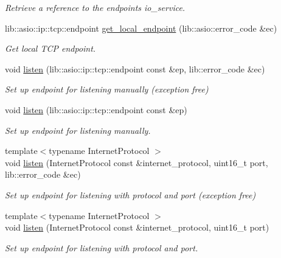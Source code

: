 \begin{DoxyCompactItemize}
\begin{DoxyCompactList}\small\item\em Retrieve a reference to the endpoint\textquotesingle{}s io\+\_\+service. \end{DoxyCompactList}\item 
lib\+::asio\+::ip\+::tcp\+::endpoint \mbox{\hyperlink{classwebsocketpp_1_1transport_1_1asio_1_1endpoint_a4147ba098fc2f1669d2f880b47917342}{get\+\_\+local\+\_\+endpoint}} (lib\+::asio\+::error\+\_\+code \&ec)
\begin{DoxyCompactList}\small\item\em Get local T\+CP endpoint. \end{DoxyCompactList}\item 
void \mbox{\hyperlink{classwebsocketpp_1_1transport_1_1asio_1_1endpoint_ac36c2b22a7c2550663792472a728f615}{listen}} (lib\+::asio\+::ip\+::tcp\+::endpoint const \&ep, lib\+::error\+\_\+code \&ec)
\begin{DoxyCompactList}\small\item\em Set up endpoint for listening manually (exception free) \end{DoxyCompactList}\item 
void \mbox{\hyperlink{classwebsocketpp_1_1transport_1_1asio_1_1endpoint_ab3d7708b939531c5c803e3b148a9b009}{listen}} (lib\+::asio\+::ip\+::tcp\+::endpoint const \&ep)
\begin{DoxyCompactList}\small\item\em Set up endpoint for listening manually. \end{DoxyCompactList}\item 
{\footnotesize template$<$typename Internet\+Protocol $>$ }\\void \mbox{\hyperlink{classwebsocketpp_1_1transport_1_1asio_1_1endpoint_ae6813b9ecda67a13a78967f72e77b061}{listen}} (Internet\+Protocol const \&internet\+\_\+protocol, uint16\+\_\+t port, lib\+::error\+\_\+code \&ec)
\begin{DoxyCompactList}\small\item\em Set up endpoint for listening with protocol and port (exception free) \end{DoxyCompactList}\item 
{\footnotesize template$<$typename Internet\+Protocol $>$ }\\void \mbox{\hyperlink{classwebsocketpp_1_1transport_1_1asio_1_1endpoint_ad08b16daae1fac46679245ec7d0c8952}{listen}} (Internet\+Protocol const \&internet\+\_\+protocol, uint16\+\_\+t port)
\begin{DoxyCompactList}\small\item\em Set up endpoint for listening with protocol and port. \end{DoxyCompactList}\item 

\end{DoxyCompactItemize}
